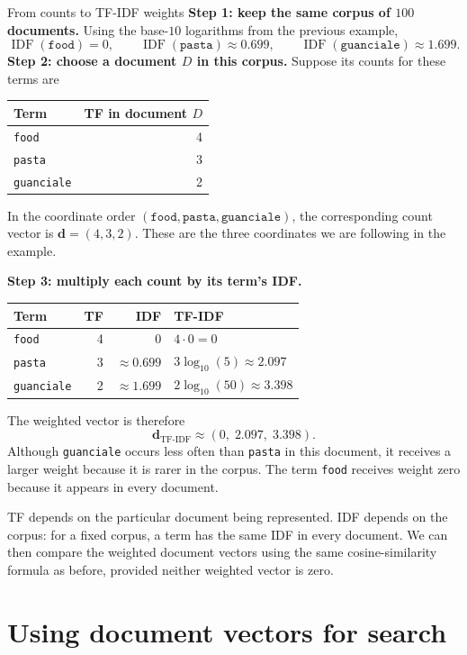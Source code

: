 \documentclass[a4paper,12pt,oneside]{report}
\begin{document}
\begin{framedexample}{From counts to TF-IDF weights}
\textbf{Step 1: keep the same corpus of $100$ documents.}
Using the base-$10$ logarithms from the previous example,
\[
  \operatorname{IDF}(\texttt{food})=0,\qquad
  \operatorname{IDF}(\texttt{pasta})\approx0.699,\qquad
  \operatorname{IDF}(\texttt{guanciale})\approx1.699.
\]
\textbf{Step 2: choose a document $D$ in this corpus.}
Suppose its counts for these terms are
\begin{center}
\begin{tabular}{l|r}
  Term & TF in document $D$\\\hline
  \texttt{food} & 4\\
  \texttt{pasta} & 3\\
  \texttt{guanciale} & 2
\end{tabular}
\end{center}
In the coordinate order
$(\texttt{food},\texttt{pasta},\texttt{guanciale})$, the corresponding
count vector is $\mathbf d=(4,3,2)$. These are the three coordinates
we are following in the example.

\textbf{Step 3: multiply each count by its term's IDF.}
\begin{center}
\begin{tabular}{l|r|r|l}
  Term & TF & IDF & TF-IDF\\\hline
  \texttt{food} & 4 & 0 & $4\cdot0=0$\\
  \texttt{pasta} & 3 & $\approx0.699$ & $3\log_{10}(5)\approx2.097$\\
  \texttt{guanciale} & 2 & $\approx1.699$ & $2\log_{10}(50)\approx3.398$
\end{tabular}
\end{center}
The weighted vector is therefore
\[
  \mathbf d_{\text{TF-IDF}}\approx(0,\;2.097,\;3.398).
\]
Although \texttt{guanciale} occurs less often than \texttt{pasta} in
this document, it receives a larger weight because it is rarer in
the corpus. The term \texttt{food} receives weight zero because it
appears in every document.
\end{framedexample}

TF depends on the particular document being represented. IDF depends
on the corpus: for a fixed corpus, a term has the same IDF in every
document. We can then compare the weighted document vectors using
the same cosine-similarity formula as before, provided neither
weighted vector is zero.

\section{Using document vectors for search}\label{sec:vector-search}
\end{document}
